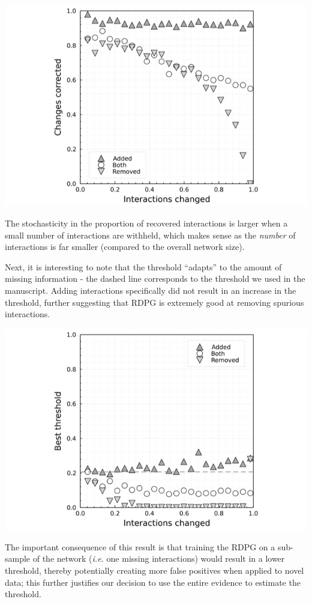 \includegraphics[width=\textwidth]{./figures/supplementary/sensibility_recovery.png}

The stochasticity in the proportion of recovered interactions is larger
when a small number of interactions are withheld, which makes sense as
the \emph{number} of interactions is far smaller (compared to the
overall network size).

Next, it is interesting to note that the threshold ``adapts'' to the
amount of missing information - the dashed line corresponds to the
threshold we used in the manuscript. Adding interactions specifically
did not result in an increase in the threshold, further suggesting that
RDPG is extremely good at removing spurious interactions.

\includegraphics[width=\textwidth]{./figures/supplementary/sensibility_threshold.png}

The important consequence of this result is that training the RDPG on a
sub-sample of the network (\emph{i.e.} one missing interactions) would
result in a lower threshold, thereby potentially creating more false
positives when applied to novel data; this further justifies our
decision to use the entire evidence to estimate the threshold.

